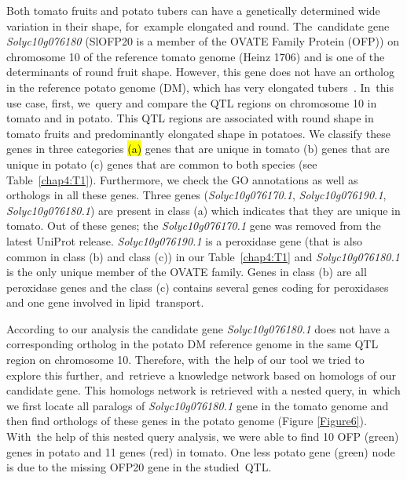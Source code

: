 \documentclass[applsci,article,accept,moreauthors,pdftex]{Definitions/mdpi}
\begin{document}
{Both tomato fruits and potato tubers can have a genetically determined wide variation in their shape, for~example elongated and round. The~candidate gene \textit{Solyc10g076180} (SlOFP20 is a member of the OVATE Family Protein (OFP)) on chromosome 10 of the reference tomato genome (Heinz 1706) and is one of the determinants of round fruit shape. However, this gene does not have an ortholog in the reference potato genome (DM), which has very elongated tubers~\cite{wu2018common}. In~this use case, first, we~query and compare the QTL regions on chromosome 10 in tomato and in potato. This QTL regions are associated with round shape in tomato fruits and predominantly elongated shape in potatoes. We classify these genes in three categories \hl{(a)} %
 genes that are unique in tomato (b) genes that are unique in potato (c) genes that are common to both species (see Table~\ref{chap4:T1}). Furthermore, we check the GO annotations as well as orthologs in all these genes. Three genes (\textit{Solyc10g076170.1}, \textit{Solyc10g076190.1}, \textit{Solyc10g076180.1}) are present in class (a) which indicates that they are unique in tomato. Out of these genes; the \textit{Solyc10g076170.1} gene was removed from the latest UniProt release. \textit{Solyc10g076190.1} is a peroxidase gene (that is also common in class (b) and class (c)) in our Table~\ref{chap4:T1} and \textit{Solyc10g076180.1} is the only unique member of the OVATE family. Genes in class (b) are all peroxidase genes and the class (c) contains several genes coding for peroxidases and one gene involved in lipid~transport. 



 According to our analysis the candidate gene \textit{Solyc10g076180.1} does not have a  corresponding ortholog in the potato DM reference genome in the same QTL region on chromosome 10. Therefore, with~the help of our tool we tried to explore this further, and~retrieve a knowledge network based on homologs of our candidate gene. This homologs network is retrieved with a nested query, in~which we first locate all paralogs of \textit{Solyc10g076180.1} gene in the tomato genome and then find orthologs of these genes in the potato genome (Figure \ref{Figure6}). With~the help of this nested query analysis, we were able to find 10 OFP (green) genes in potato and 11 genes (red) in tomato. One less potato gene (green) node is due to the missing OFP20 gene in the studied~QTL. 
 
}
\end{document}
